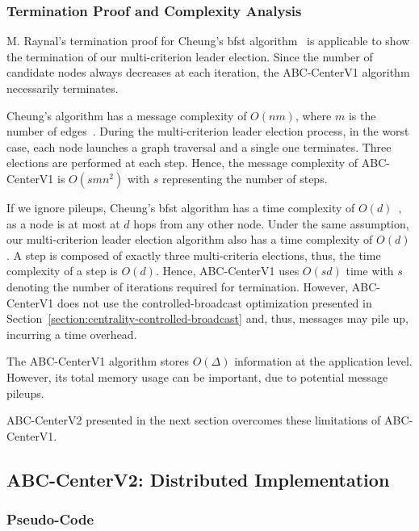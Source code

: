 \subsubsection{Termination Proof and Complexity Analysis}
\label{cout-theorique}

M. Raynal's termination proof for Cheung's \gls{bfst} algorithm~\cite{raynal2013distributed} is applicable to show the termination of our multi-criterion leader election. Since the number of candidate nodes always decreases at each iteration, the ABC-CenterV1 algorithm necessarily terminates.

Cheung's algorithm has a message complexity of $O(nm)$, where $m$ is the number of edges~\cite{lynch1996distributed}. During the multi-criterion leader election process, in the worst case, each node launches a graph traversal and a single one terminates. Three elections are performed at each step. Hence, the message complexity of ABC-CenterV1 is $O(smn^2)$ with $s$ representing the number of steps.

If we ignore pileups, Cheung's \gls{bfst} algorithm has a time complexity of $O(d)$~\cite{raynal2013distributed}, as a node is at most at $d$ hops from any other node. Under the same assumption, our multi-criterion leader election algorithm also has a time complexity of $O(d)$. A step is composed of exactly three multi-criteria elections, thus, the time complexity of a step is $O(d)$. Hence, ABC-CenterV1 uses $O(sd)$ time with $s$ denoting the number of iterations required for termination. However, ABC-CenterV1 does not use the controlled-broadcast optimization presented in Section~\ref{section:centrality-controlled-broadcast} and, thus, messages may pile up, incurring a time overhead.

The ABC-CenterV1 algorithm stores $O(\Delta)$ information at the application level. However, its total memory usage can be important, due to potential message pileups.

ABC-CenterV2 presented in the next section overcomes these limitations of ABC-CenterV1.

\subsection{ABC-CenterV2: Distributed Implementation}

\subsubsection{Pseudo-Code}

